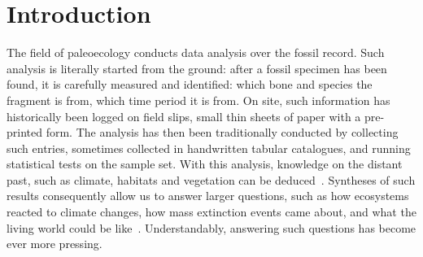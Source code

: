\documentclass[english,twoside,openright]{UH_DS_MSc}
\begin{document}
\mytableofcontents

\mynomenclature


\chapter{Introduction}


The field of paleoecology conducts data analysis over the fossil record.
Such analysis is literally started from the ground: after a fossil specimen has been found, it is 
carefully measured and identified: which bone and species the fragment is from, which time period it is from. On site, such information has historically been logged on field slips, small thin sheets of 
paper with a pre-printed form. The analysis has then been traditionally conducted by 
collecting such entries, sometimes collected in handwritten tabular catalogues, and running statistical 
tests on the sample set. With this analysis, knowledge on the distant past, such as climate, habitats and 
vegetation can be deduced~\cite{Faith_Lyman_2019}. Syntheses of such results consequently allow us to 
answer larger questions, such as how ecosystems reacted to climate changes, how mass extinction events 
came about, and what the living world could be like~\cite{Zliobaite2023}. Understandably, answering such 
questions has become ever more pressing.

\end{document}
